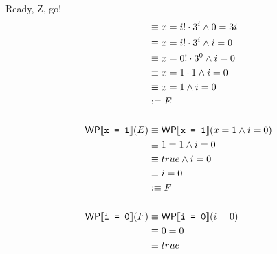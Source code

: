 \documentclass[
  english
]{tumteaching}
\begin{document}
\begin{assignment}[H, points=6]{Ready, Z, go!}
\begin{align*}
		&\equiv x = i! \cdot 3^i \land 0 = 3i \\
		&\equiv x = i! \cdot 3^i \land i = 0 \\
		&\equiv x = 0! \cdot 3^0 \land i = 0 \\
		&\equiv x = 1 \cdot 1 \land i = 0 \\
		&\equiv x = 1 \land i = 0 \\
		&:\equiv E \\
		\\
		\textsf{WP}\llbracket{}\texttt{x = 1}\rrbracket{}(E)
		&\equiv \textsf{WP}\llbracket{}\texttt{x = 1}\rrbracket{}(x = 1 \land i = 0) \\
		&\equiv 1 = 1 \land i = 0 \\
		&\equiv true \land i = 0 \\
		&\equiv i = 0 \\
		&:\equiv F \\
		\\
		\textsf{WP}\llbracket{}\texttt{i = 0}\rrbracket{}(F)
		&\equiv \textsf{WP}\llbracket{}\texttt{i = 0}\rrbracket{}(i = 0) \\
		&\equiv 0 = 0 \\
		&\equiv true
	\end{align*}



\end{assignment}
\end{document}
